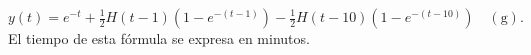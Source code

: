 \[y(t)=e^{-t}+\tfrac12H(t-1)(1-e^{-(t-1)})-\tfrac12H(t-10)(1-e^{-(t-10)})\quad(\mathrm g).\] El tiempo de esta fórmula se expresa en minutos.
